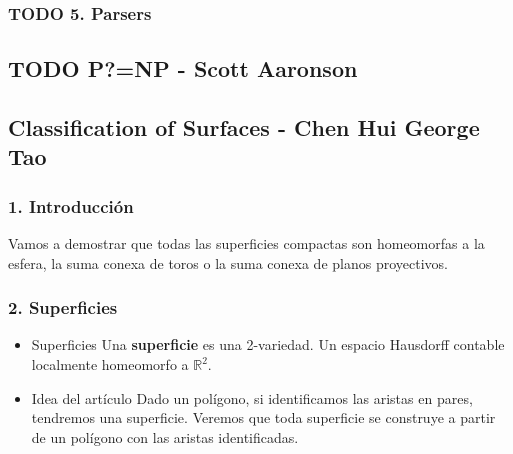 \documentclass[11pt]{article}
\begin{document}
\subsubsection*{{\bfseries\sffamily TODO} 5. Parsers}
\label{sec-1-2-5}
\subsection*{{\bfseries\sffamily TODO} P?=NP - Scott Aaronson}
\label{sec-1-3}
\subsection*{Classification of Surfaces - Chen Hui George Tao}
\label{sec-1-4}
\subsubsection*{1. Introducción}
\label{sec-1-4-1}
Vamos a demostrar que todas las superficies compactas son homeomorfas
a la esfera, la suma conexa de toros o la suma conexa de planos proyectivos.

\subsubsection*{2. Superficies}
\label{sec-1-4-2}
\begin{itemize}
\item Superficies
\label{sec-1-4-2-1}
Una \textbf{superficie} es una 2-variedad. Un espacio Hausdorff contable
localmente homeomorfo a $\mathbb{R}^2$.

\item Idea del artículo
\label{sec-1-4-2-2}
Dado un polígono, si identificamos las aristas en pares, tendremos una
superficie. Veremos que toda superficie se construye a partir de un
polígono con las aristas identificadas.
\end{itemize}
\end{document}
